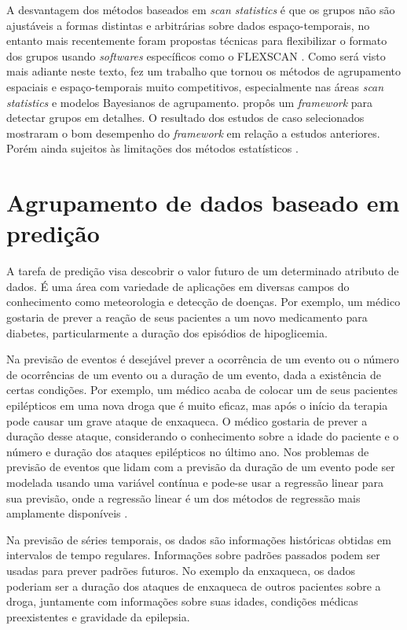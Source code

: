 A desvantagem dos métodos baseados em \emph{scan statistics} é que os grupos não são ajustáveis a formas distintas e arbitrárias sobre dados espaço-temporais, no entanto mais recentemente foram propostas técnicas para flexibilizar o formato dos grupos usando \emph{softwares} específicos como o FLEXSCAN \cite{Tango2005}. Como será visto mais adiante neste texto,  fez um trabalho que tornou os métodos de agrupamento espaciais e espaço-temporais muito competitivos, especialmente nas áreas \emph{scan statistics} e modelos Bayesianos de agrupamento.  propôs um \emph{framework} para detectar grupos em detalhes. O resultado dos estudos de caso selecionados mostraram o bom desempenho do \emph{framework} em relação a estudos anteriores. Porém ainda sujeitos às limitações dos métodos estatísticos \cite{Zhicheng:2019}.   

\section{Agrupamento de dados baseado em predição}

A tarefa de predição visa descobrir o valor futuro de um determinado atributo de dados. É uma área com variedade de aplicações em diversas campos do conhecimento como meteorologia e detecção de doenças. Por exemplo, um médico gostaria de prever a reação de seus pacientes a um novo medicamento para diabetes, particularmente a duração dos episódios de hipoglicemia.

Na previsão de eventos é desejável prever a ocorrência de um evento ou o número de ocorrências de um evento ou a duração de um evento, dada a existência de certas condições. Por exemplo, um médico acaba de colocar um de seus pacientes epilépticos em uma nova droga que é muito eficaz, mas após o início da terapia pode causar um grave ataque de enxaqueca. O médico gostaria de prever a duração desse ataque, considerando o conhecimento sobre a idade do paciente e o número e duração dos ataques epilépticos no último ano. Nos problemas de previsão de eventos que lidam com a previsão da duração de um evento pode ser modelada usando uma variável contínua e pode-se usar a regressão linear para sua previsão, onde a regressão linear é um dos métodos de regressão mais amplamente disponíveis \cite{Mitsa:2010}.

Na previsão de séries temporais, os dados são informações históricas obtidas em intervalos de tempo regulares. Informações sobre padrões passados podem ser usadas para prever padrões futuros. No exemplo da enxaqueca, os dados poderiam ser a duração dos ataques de enxaqueca de outros pacientes sobre a droga, juntamente com informações sobre suas idades, condições médicas preexistentes e gravidade da epilepsia.


